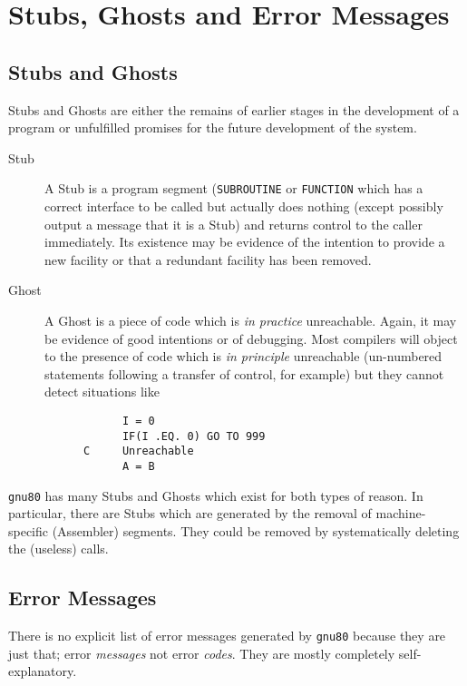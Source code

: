 \chapter{\sf Stubs, Ghosts and Error Messages}
\section{\sf Stubs and Ghosts}
Stubs and Ghosts are either the remains of earlier stages in the
development of a program or unfulfilled promises for the future
development of the system.
\begin{description}
\item[Stub] A Stub is a program segment ({\tt SUBROUTINE} or {\tt FUNCTION}
which has a correct interface to be called but actually does nothing
(except possibly output a message that it is a Stub) and returns control
to the caller immediately.
Its existence may be evidence of the intention to provide a new facility
or that a redundant facility has been removed.
\item[Ghost] A Ghost is a piece of code which is {\em in practice}
unreachable. Again, it may be evidence of good intentions or of
debugging. Most compilers will object to the presence of code which is
{\em in principle} unreachable (un-numbered statements following a
transfer of control, for example) but they cannot detect situations like
\begin{verbatim}
            I = 0
            IF(I .EQ. 0) GO TO 999
      C     Unreachable
            A = B
\end{verbatim}
\end{description}
{\tt gnu80} has many Stubs and Ghosts which exist for both types of
reason. In particular, there are Stubs which are generated by the
removal of machine-specific (Assembler) segments. They could be removed
by systematically deleting the (useless) calls.
\section{\sf Error Messages}
There is no explicit list of error messages generated by {\tt gnu80}
because they are just that; error {\em messages} not error {\em codes}.
They are mostly completely self-explanatory.
